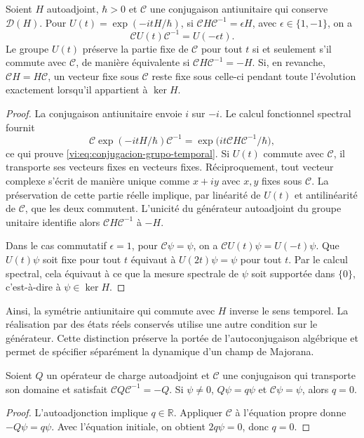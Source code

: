 \begin{proposition}
\label{vi:prop:conjugacion-evolucion}
Soient $H$ autoadjoint, $\hbar>0$ et $\mathcal C$ une conjugaison
antiunitaire qui conserve $\mathcal D(H)$. Pour
$U(t)=\exp(-itH/\hbar)$, si
$\mathcal C H\mathcal C^{-1}=\epsilon H$, avec
$\epsilon\in\{1,-1\}$, on a
\begin{equation}
 \mathcal C U(t)\mathcal C^{-1}=U(-\epsilon t).
 \label{vi:eq:conjugacion-grupo-temporal}
\end{equation}
Le groupe $U(t)$ préserve la partie fixe de $\mathcal C$ pour tout $t$
si et seulement s’il commute avec $\mathcal C$, de manière équivalente si
$\mathcal C H\mathcal C^{-1}=-H$.
Si, en revanche, $\mathcal C H=H\mathcal C$, un vecteur fixe sous
$\mathcal C$ reste fixe sous celle-ci pendant toute l’évolution
exactement lorsqu’il appartient à $\ker H$.
\end{proposition}
\begin{proof}
La conjugaison antiunitaire envoie $i$ sur $-i$. Le calcul fonctionnel
spectral fournit
\[
 \mathcal C\exp(-itH/\hbar)\mathcal C^{-1}
 =\exp\bigl(it\mathcal C H\mathcal C^{-1}/\hbar\bigr),
\]
ce qui prouve \eqref{vi:eq:conjugacion-grupo-temporal}. Si $U(t)$ commute
avec $\mathcal C$, il transporte ses vecteurs fixes en vecteurs fixes.
Réciproquement, tout vecteur complexe s’écrit de manière unique comme
$x+iy$ avec $x,y$ fixes sous $\mathcal C$. La préservation de cette partie
réelle implique, par linéarité de $U(t)$ et antilinéarité de
$\mathcal C$, que les deux commutent. L’unicité du générateur
autoadjoint du groupe unitaire identifie alors
$\mathcal C H\mathcal C^{-1}$ à $-H$.

Dans le cas commutatif $\epsilon=1$, pour $\mathcal C\psi=\psi$,
on a $\mathcal C U(t)\psi=U(-t)\psi$. Que $U(t)\psi$ soit fixe
pour tout $t$ équivaut à $U(2t)\psi=\psi$ pour tout $t$. Par le
calcul spectral, cela équivaut à ce que la mesure spectrale de $\psi$
soit supportée dans $\{0\}$, c’est-à-dire à $\psi\in\ker H$.
\end{proof}

Ainsi, la symétrie antiunitaire qui commute avec $H$ inverse le sens
temporel. La réalisation par des états réels conservés utilise
une autre condition sur le générateur. Cette distinction préserve la portée
de l’autoconjugaison algébrique et permet de spécifier séparément la
dynamique d’un champ de Majorana.

\begin{proposition}
\label{vi:prop:carga-real}
Soient $Q$ un opérateur de charge autoadjoint et $\mathcal C$ une
conjugaison qui transporte son domaine et satisfait
$\mathcal C Q\mathcal C^{-1}=-Q$. Si $\psi\ne0$,
$Q\psi=q\psi$ et $\mathcal C\psi=\psi$, alors $q=0$.
\end{proposition}
\begin{proof}
L’autoadjonction implique $q\in\mathbb R$. Appliquer $\mathcal C$
à l’équation propre donne $-Q\psi=q\psi$. Avec l’équation initiale,
on obtient $2q\psi=0$, donc $q=0$.
\end{proof}

